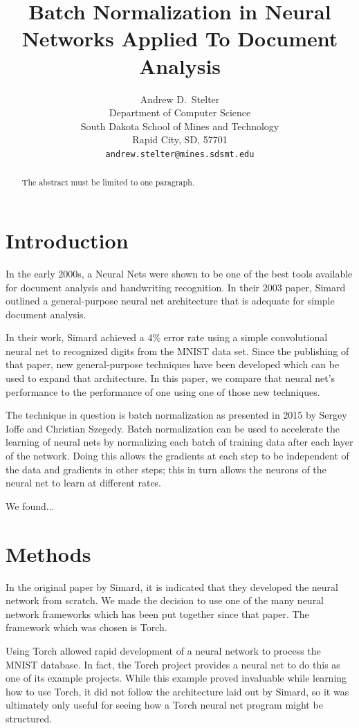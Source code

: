 \documentclass{article}
\title{Batch Normalization in Neural Networks Applied To Document Analysis}
\author{
  Andrew D.~Stelter \\
  Department of Computer Science\\
  South Dakota School of Mines and Technology\\
  Rapid City, SD, 57701 \\
  \texttt{andrew.stelter@mines.sdsmt.edu} \\
}
\begin{document}

\maketitle

\begin{abstract}
  The abstract must be limited to
  one paragraph.
\end{abstract}

\section{Introduction}

In the early 2000s, a Neural Nets were shown to be one of the best tools available for
document analysis and handwriting recognition. 
\cite{tay2001offline} \cite{sinha1999improved}
In their 2003 paper, Simard 
\cite{simard2003best} 
outlined a general-purpose neural net architecture that
is adequate for simple document analysis.

In their work, Simard achieved a 4\% error rate using a simple convolutional neural net to recognized digits from the MNIST 
\cite{mnist}
data set. Since the publishing of that paper, new general-purpose techniques have been developed which can be used to expand that architecture. In this paper, we compare that neural net's performance to the performance of one using one of those new techniques.

The technique in question is batch normalization as presented in 2015 by Sergey Ioffe and Christian Szegedy. 
\cite{ioffe2015batch}
Batch normalization can be used to accelerate the learning of neural nets by normalizing each batch of training data after each layer of the network. Doing this allows the gradients at each step to be independent of the data and gradients in other steps; this in turn allows the neurons of the neural net to learn at different rates.

We found...

\section{Methods}
In the original paper by Simard, it is indicated that they developed the neural network from scratch. We made the decision to use one of the many neural network frameworks which has been put together since that paper. The framework which was chosen is Torch. 
\cite{torch}

Using Torch allowed rapid development of a neural network to process the MNIST database. In fact, the Torch project provides a neural net to do this as one of its example projects. While this example proved invaluable while learning how to use Torch, it did not follow the architecture laid out by Simard, so it was ultimately only useful for seeing how a Torch neural net program might be structured.
\end{document}
